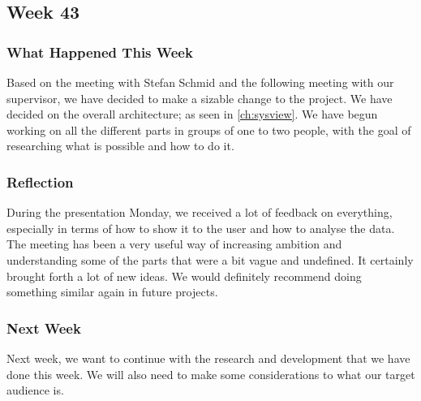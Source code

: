 \subsection{Week 43}\label{Week43}
\subsubsection{What Happened This Week}
Based on the meeting with Stefan Schmid and the following meeting with our
supervisor, we have decided to make a sizable change to the project. We have
decided on the overall architecture; as seen in \autoref{ch:sysview}.
We have begun working on all the different parts in groups of one to two
people, with the goal of researching what is possible and how to do it.



\subsubsection{Reflection}
During the presentation Monday, we received a lot of feedback on everything,
especially in terms of how to show it to the user and how to analyse the data.
The meeting has been a very useful way of increasing ambition and understanding
some of the parts that were a bit vague and undefined. It certainly
brought forth a lot of new ideas. We would definitely recommend doing something
similar again in future projects.

\subsubsection{Next Week}
Next week, we want to continue with the research and development that we have
done this week. We will also need to make some considerations to what our target
audience is.


